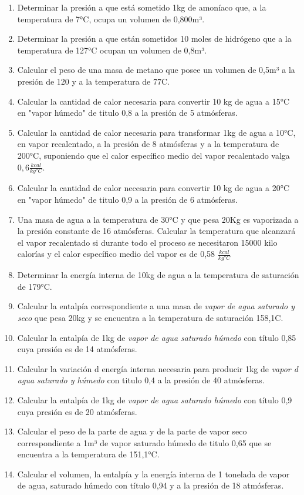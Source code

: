 \documentclass[../main]{subfiles}
\begin{document}
\begin{enumerate}
  \item Determinar la presión a que está sometido 1kg de amoníaco
    que, a la temperatura de 7°C, ocupa un volumen de 0,800m³.
  \item Determinar la presión a que están sometidos 10 moles de
    hidrógeno que a la temperatura de 127°C ocupan un volumen de 0,8m³.
  \item Calcular el peso de una masa de metano que posee un volumen
    de 0,5m³ a la presión de \SI{120}{\atm} y a la temperatura de 77C.
  \item Calcular la cantidad de calor necesaria para convertir 10 kg
    de agua a 15°C en "vapor húmedo" de titulo 0,8 a la presión de 5 atmósferas.
  \item Calcular la cantidad de calor necesaria para transformar 1kg
    de agua a 10°C, en vapor recalentado, a la presión de 8
    atmósferas y a la temperatura de 200°C, suponiendo que el calor
    específico medio del vapor recalentado valga $0,6\frac{kcal}{kg °C}$.
  \item Calcular la cantidad de calor necesaria para convertir 10 kg
    de agua a 20°C en "vapor húmedo" de titulo 0,9 a la presión de 6 atmósferas.
  \item Una masa de agua a la temperatura de 30°C y que pesa 20Kg es
    vaporizada a la presión constante de 16 atmósferas. Calcular la
    temperatura que alcanzará el vapor recalentado si durante todo el
    proceso se necesitaron 15000 kilo calorías y el calor específico
    medio del vapor es de 0,58 $\frac{kcal}{kg °C}$
  \item Determinar la energía interna de 10kg de agua a la
    temperatura de saturación de 179°C.
  \item Calcular la entalpía correspondiente a una masa de
    \emph{vapor de agua saturado y seco} que pesa 20kg y se encuentra
    a la temperatura de saturación 158,1C.
  \item Calcular la entalpía de 1kg de \emph{vapor de agua saturado
    húmedo} con título 0,85 cuya presión es de 14 atmósferas.
  \item Calcular la variación d energía interna necesaria para
    producir 1kg de \emph{vapor d agua saturado y húmedo} con titulo
    0,4 a la presión de 40 atmósferas.
  \item Calcular la entalpía de 1kg de \emph{vapor de agua saturado
    húmedo} con título 0,9 cuya presión es de 20 atmósferas.
  \item Calcular el peso de la parte de agua y de la parte de vapor
    seco correspondiente a 1m³ de vapor saturado húmedo de titulo
    0,65 que se encuentra a la temperatura de 151,1°C.
  \item Calcular el volumen, la entalpía y la energía interna de 1
    tonelada de vapor de agua, saturado húmedo con título 0,94 y a la
    presión de 18 atmósferas.
\end{enumerate}
\end{document}
